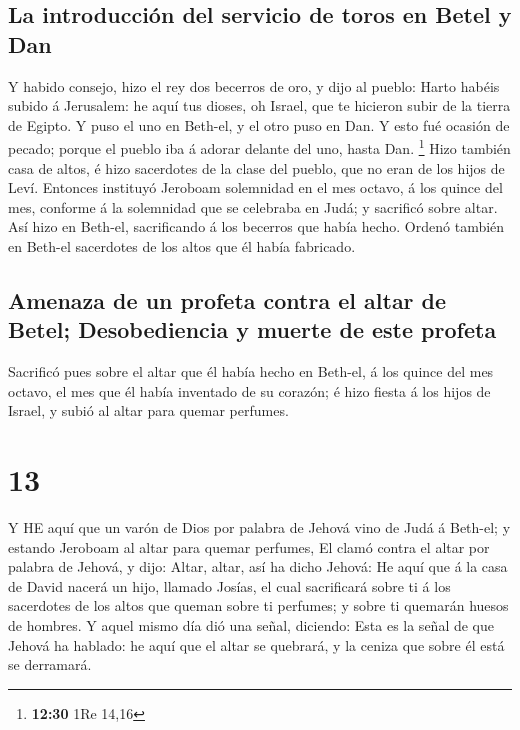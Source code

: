 \hypertarget{la-introducciuxf3n-del-servicio-de-toros-en-betel-y-dan}{%
\subsection{La introducción del servicio de toros en Betel y
Dan}\label{la-introducciuxf3n-del-servicio-de-toros-en-betel-y-dan}}

 Y habido consejo, hizo el rey dos becerros de oro, y dijo
al pueblo: Harto habéis subido á Jerusalem: he aquí tus dioses, oh
Israel, que te hicieron subir de la tierra de Egipto.  Y
puso el uno en Beth-el, y el otro puso en Dan.  Y esto fué
ocasión de pecado; porque el pueblo iba á adorar delante del uno, hasta
Dan. \footnote{\textbf{12:30} 1Re 14,16}  Hizo también casa
de altos, é hizo sacerdotes de la clase del pueblo, que no eran de los
hijos de Leví.  Entonces instituyó Jeroboam solemnidad en
el mes octavo, á los quince del mes, conforme á la solemnidad que se
celebraba en Judá; y sacrificó sobre altar. Así hizo en Beth-el,
sacrificando á los becerros que había hecho. Ordenó también en Beth-el
sacerdotes de los altos que él había fabricado.

\hypertarget{amenaza-de-un-profeta-contra-el-altar-de-betel-desobediencia-y-muerte-de-este-profeta}{%
\subsection{Amenaza de un profeta contra el altar de Betel;
Desobediencia y muerte de este
profeta}\label{amenaza-de-un-profeta-contra-el-altar-de-betel-desobediencia-y-muerte-de-este-profeta}}

 Sacrificó pues sobre el altar que él había hecho en
Beth-el, á los quince del mes octavo, el mes que él había inventado de
su corazón; é hizo fiesta á los hijos de Israel, y subió al altar para
quemar perfumes.

\hypertarget{section-12}{%
\section{13}\label{section-12}}

 Y HE aquí que un varón de Dios por palabra de Jehová vino
de Judá á Beth-el; y estando Jeroboam al altar para quemar perfumes,
 El clamó contra el altar por palabra de Jehová, y dijo:
Altar, altar, así ha dicho Jehová: He aquí que á la casa de David nacerá
un hijo, llamado Josías, el cual sacrificará sobre ti á los sacerdotes
de los altos que queman sobre ti perfumes; y sobre ti quemarán huesos de
hombres.  Y aquel mismo día dió una señal, diciendo: Esta es
la señal de que Jehová ha hablado: he aquí que el altar se quebrará, y
la ceniza que sobre él está se derramará.

